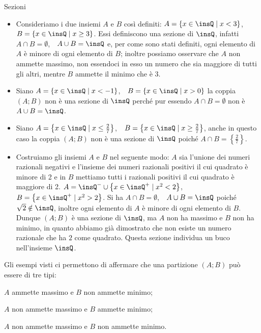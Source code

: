 \begin{exrig}
 \begin{esempio}
 Sezioni
 \begin{itemize}
 \item Consideriamo i due insiemi $A$ e $B$ così definiti: $A=\left\{x\in \insQ \mid x<3\right\}$,\ \ 
$B=\left\{x\in \insQ \mid x \ge 3\right\}$. Essi definiscono una sezione di $\insQ$, infatti
$A \cap B=\emptyset$,~~$A \cup B=\insQ$ e, per come sono stati definiti, ogni elemento di $A$ è minore di ogni elemento di $B$; inoltre possiamo osservare che $A$ non ammette massimo, non essendoci in esso un numero che sia maggiore di tutti gli altri, mentre $B$ ammette il minimo che è 3.
 \item Siano $A=\left\{x\in \insQ \mid x<-1\right\}$,~~$B=\left\{x \in \insQ \mid x>0\right\}$ la coppia $(A;B)$ non è una sezione di $\insQ$ perché pur essendo $A\cap B=\emptyset$ non è $A\cup B=\insQ$.
 \item Siano $A=\left\{x\in \insQ \mid x \le \frac{2}{7}\right\}$,~~$B=\left\{x \in \insQ \mid x \ge \frac{2}{7}\right\}$, anche in questo caso la coppia $(A;B)$ non è una sezione di $\insQ$ poiché $A\cap B=\left\{\frac{2}{7}\right\}$.
 \item Costruiamo gli insiemi $A$ e $B$ nel seguente modo: $A$ sia l'unione dei numeri razionali negativi e l'insieme dei numeri razionali positivi il cui quadrato è minore di 2 e in $B$ mettiamo tutti i razionali positivi il cui quadrato è maggiore di 2. $A=\insQ^{-} \cup \left\{x \in \insQ^{+} \mid x^{2}<2\right\}$, $B=\left\{x \in \insQ^{+} \mid x^{2}>2\right\}$. Si ha $A \cap B=\emptyset$,~~$A\cup B=\insQ$ poiché $\sqrt{2}\notin\insQ$, inoltre ogni elemento di $A$ è minore di ogni elemento di $B$. Dunque $(A;B)$ è una sezione di $\insQ$, ma $A$ non ha massimo e $B$ non ha minimo, in quanto abbiamo già dimostrato che non esiste un numero razionale che ha $2$ come quadrato. Questa sezione individua un buco nell'insieme $\insQ$.
 \end{itemize}
 \end{esempio}
\end{exrig}

Gli esempi visti ci permettono di affermare che una partizione $(A;B)$ può essere di tre tipi:
\begin{itemize*}
\item $A$ ammette massimo e $B$ non ammette minimo;
\item $A$ non ammette massimo e $B$ ammette minimo;
\item $A$ non ammette massimo e $B$ non ammette minimo.
\end{itemize*}

